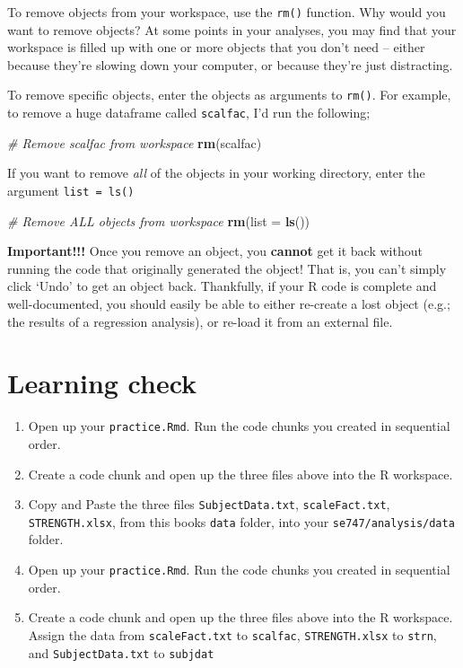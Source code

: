 \documentclass[
]{book}
\newenvironment{Shaded}{\begin{snugshade}}{\end{snugshade}}
\newcommand{\CommentTok}[1]{\textcolor[rgb]{0.56,0.35,0.01}{\textit{#1}}}
\newcommand{\DataTypeTok}[1]{\textcolor[rgb]{0.13,0.29,0.53}{#1}}
\newcommand{\KeywordTok}[1]{\textcolor[rgb]{0.13,0.29,0.53}{\textbf{#1}}}
\newcommand{\NormalTok}[1]{#1}
\begin{document}
To remove objects from your workspace, use the \texttt{rm()} function. Why would you want to remove objects? At some points in your analyses, you may find that your workspace is filled up with one or more objects that you don't need -- either because they're slowing down your computer, or because they're just distracting.

To remove specific objects, enter the objects as arguments to \texttt{rm()}. For example, to remove a huge dataframe called \texttt{scalfac}, I'd run the following;

\begin{Shaded}
\begin{Highlighting}[]
\CommentTok{# Remove scalfac from workspace}
\KeywordTok{rm}\NormalTok{(scalfac)}
\end{Highlighting}
\end{Shaded}

If you want to remove \emph{all} of the objects in your working directory, enter the argument \texttt{list\ =\ ls()}

\begin{Shaded}
\begin{Highlighting}[]
\CommentTok{# Remove ALL objects from workspace}
\KeywordTok{rm}\NormalTok{(}\DataTypeTok{list =} \KeywordTok{ls}\NormalTok{())}
\end{Highlighting}
\end{Shaded}

\textbf{Important!!!} Once you remove an object, you \textbf{cannot} get it back without running the code that originally generated the object! That is, you can't simply click `Undo' to get an object back. Thankfully, if your R code is complete and well-documented, you should easily be able to either re-create a lost object (e.g.; the results of a regression analysis), or re-load it from an external file.

\hypertarget{learning-check}{%
\section*{Learning check}\label{learning-check}}

\begin{enumerate}
\def\labelenumi{\arabic{enumi}.}
\item
  Open up your \texttt{practice.Rmd}. Run the code chunks you created in sequential order.
\item
  Create a code chunk and open up the three files above into the R workspace.
\item
  Copy and Paste the three files \texttt{SubjectData.txt}, \texttt{scaleFact.txt}, \texttt{STRENGTH.xlsx}, from this books \texttt{data} folder, into your \texttt{se747/analysis/data} folder.
\item
  Open up your \texttt{practice.Rmd}. Run the code chunks you created in sequential order.
\item
  Create a code chunk and open up the three files above into the R workspace. Assign the data from \texttt{scaleFact.txt} to \texttt{scalfac}, \texttt{STRENGTH.xlsx} to \texttt{strn}, and \texttt{SubjectData.txt} to \texttt{subjdat}
\end{enumerate}
\end{document}
